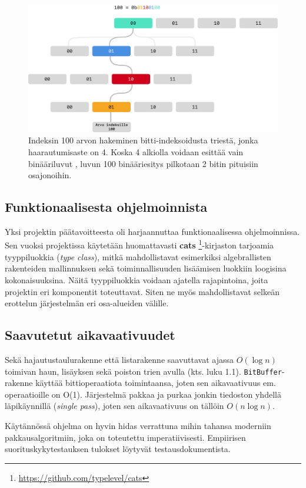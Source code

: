 \documentclass{article}
\newcommand{\code}{\texttt}
\begin{document}
\begin{figure}
  \includegraphics[width=\linewidth]{trie}
  \caption{Indeksin 100 arvon hakeminen bitti-indeksoidusta triestä, jonka haarautumisaste on 4. Koska 4 alkiolla voidaan esittää vain binääriluvut , luvun 100 binääriesitys pilkotaan 2 bitin pituisiin osajonoihin.}
  \label{fig:trie}
\end{figure}

\subsection{Funktionaalisesta ohjelmoinnista}

Yksi projektin päätavoitteesta oli harjaannuttaa funktionaalisessa ohjelmoinnissa. Sen vuoksi projektissa käytetään
huomattavasti \textbf{cats} \footnote{\url{https://github.com/typelevel/cats}}-kirjaston tarjoamia tyyppiluokkia (\textit{type class}), mitkä mahdollistavat
esimerkiksi algebrallisten rakenteiden mallinnuksen sekä toiminnallisuuden lisäämisen luokkiin loogisina kokonaisuuksina.
Näitä tyyppiluokkia voidaan ajatella rajapintoina, joita projektin eri komponentit toteuttavat.
Siten ne myös mahdollistavat selkeän erottelun järjestelmän eri osa-alueiden välille.

\subsection{Saavutetut aikavaativuudet}

Sekä hajautustaulurakenne että listarakenne saavuttavat ajassa $O(\log n)$ toimivan haun, lisäyksen sekä poiston trien avulla
(kts. luku 1.1). \code{BitBuffer}-rakenne käyttää bittioperaatiota toimintaansa, joten sen aikavaativuus em. operaatioille on O(1).
Järjestelmä pakkaa ja purkaa jonkin tiedoston yhdellä läpikäynnillä (\textit{single pass}), joten sen aikavaativuus on tällöin
$O(n \log n)$.

Käytännössä ohjelma on hyvin hidas verrattuna mihin tahansa moderniin pakkausalgoritmiin, joka on toteutettu imperatiivisesti. Empiirisen suorituskykytestauksen tulokset löytyvät testausdokumentista.

\printbibliography
\end{document}
